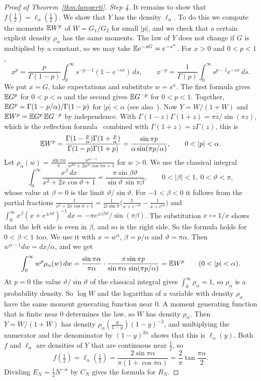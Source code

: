 \begin{proof}[Proof of Theorem~\ref{thm:lamperti}]
\emph{Step 4.} It remains to show that $f(\frac12)=\ell_\alpha(\frac12)$. We show that
$Y$ has the density $\ell_\alpha$. To do this we compute the moments $\mathbb{E} W^p$ of
$W=G_1/G_2$ for small $\lvert p\rvert$, and we check that a certain explicit density
$\rho_\alpha$ has the same moments. The law of $Y$ does not change if $G$ is multiplied
by a constant, so we may take $\mathbb{E} e^{-sG}=e^{-s^\alpha}$. For $x>0$ and $0<p<1$,
\[
x^p=\frac p{\Gamma(1-p)}\int_0^\infty s^{-p-1}(1-e^{-sx})\,ds,\qquad
x^{-p}=\frac1{\Gamma(p)}\int_0^\infty s^{p-1}e^{-sx}\,ds .
\]
We put $x=G$, take expectations and substitute $w=s^\alpha$. The first formula gives
$\mathbb{E} G^p$ for $0<p<\alpha$ and the second gives $\mathbb{E} G^{-p}$ for $0<p<1$. Together,
$\mathbb{E} G^p=\Gamma(1-p/\alpha)/\Gamma(1-p)$ for $\lvert p\rvert<\alpha$ (see
also~\cite[Theorem~2.6.3]{zolotarev1986}). Now $Y=W/(1+W)$ and $\mathbb{E} W^p=\mathbb{E} G^p\,\mathbb{E} G^{-p}$
by independence. With $\Gamma(1-z)\Gamma(1+z)=\pi z/\sin(\pi z)$, which is the
reflection formula~\cite[5.5.3]{dlmf} combined with $\Gamma(1+z)=z\Gamma(z)$, this is
\[
\mathbb{E} W^p=\frac{\Gamma(1-\frac p\alpha)\Gamma(1+\frac p\alpha)}{\Gamma(1-p)\Gamma(1+p)}
=\frac{\sin\pi p}{\alpha\sin(\pi p/\alpha)},\qquad0<\lvert p\rvert<\alpha .
\]
Let
$\rho_\alpha(w)=\frac{\sin\pi\alpha}\pi\,\frac{w^{\alpha-1}}{w^{2\alpha}+2w^\alpha\cos\pi\alpha+1}$
for $w>0$. We use the classical integral
\[
\int_0^\infty\frac{x^\beta\,dx}{x^2+2x\cos\vartheta+1}
=\frac{\pi\sin\beta\vartheta}{\sin\vartheta\,\sin\pi\beta},
\qquad0<\lvert\beta\rvert<1,\ 0<\vartheta<\pi,
\]
whose value at $\beta=0$ is the limit $\vartheta/\sin\vartheta$. For $-1<\beta<0$ it follows
from the partial fractions
$\frac1{x^2+2x\cos\vartheta+1}=\frac1{2i\sin\vartheta}\bigl(\frac1{x+e^{-i\vartheta}}-\frac1{x+e^{i\vartheta}}\bigr)$
and
$\int_0^\infty x^\beta(x+e^{\pm i\vartheta})^{-1}dx=-\pi e^{\pm i\beta\vartheta}/\sin(\pi\beta)$.
The substitution $x\mapsto1/x$ shows that the left side is even in $\beta$, and so is the
right side. So the formula holds for $0<\beta<1$ too. We use it with $x=w^\alpha$,
$\beta=p/\alpha$ and $\vartheta=\pi\alpha$. Then $w^{\alpha-1}dw=dx/\alpha$, and we get
\[
\int_0^\infty w^p\rho_\alpha(w)\,dw
=\frac{\sin\pi\alpha}{\pi\alpha}\cdot\frac{\pi\sin\pi p}{\sin\pi\alpha\,\sin(\pi p/\alpha)}
=\mathbb{E} W^p\qquad(0<\lvert p\rvert<\alpha).
\]
At $p=0$ the value $\vartheta/\sin\vartheta$ of the classical integral gives
$\int_0^\infty\rho_\alpha=1$, so $\rho_\alpha$ is a probability density. So $\log W$ and the
logarithm of a variable with density $\rho_\alpha$ have the same moment generating
function near $0$. A moment generating function that is finite near $0$ determines the
law, so $W$ has density $\rho_\alpha$. Then $Y=W/(1+W)$ has density
$\rho_\alpha(\frac y{1-y})(1-y)^{-2}$, and multiplying the numerator and the denominator
by $(1-y)^{2\alpha}$ shows that this is $\ell_\alpha(y)$. Both $f$ and $\ell_\alpha$ are
densities of $Y$ that are continuous near $\frac12$, so
\[
f(\tfrac12)=\ell_\alpha(\tfrac12)=\frac{2\sin\pi\alpha}{\pi(1+\cos\pi\alpha)}
=\frac2\pi\tan\frac{\pi\alpha}2 .
\]
Dividing $E_N=\frac12N^{-\alpha}$ by $C_N$ gives the formula for $R_N$.
\end{proof}
